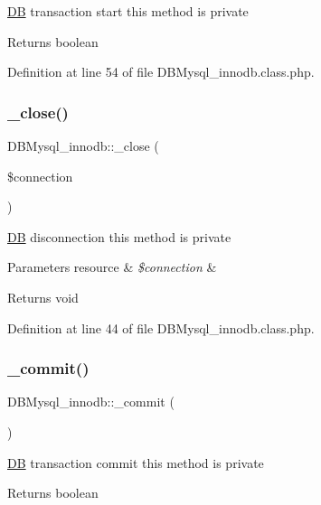 \hyperlink{classDB}{DB} transaction start this method is private \begin{DoxyReturn}{Returns}
boolean 
\end{DoxyReturn}


Definition at line 54 of file D\+B\+Mysql\+\_\+innodb.\+class.\+php.

\mbox{\label{classDBMysql__innodb_a006f982aef8b7fd2909d3912e0afb032}} 
\subsubsection{\texorpdfstring{\+\_\+close()}{\_close()}}
{\footnotesize\ttfamily D\+B\+Mysql\+\_\+innodb\+::\+\_\+close (\begin{DoxyParamCaption}\item[{}]{\$connection }\end{DoxyParamCaption})}

\hyperlink{classDB}{DB} disconnection this method is private 
\begin{DoxyParams}[1]{Parameters}
resource & {\em \$connection} & \\
\hline
\end{DoxyParams}
\begin{DoxyReturn}{Returns}
void 
\end{DoxyReturn}


Definition at line 44 of file D\+B\+Mysql\+\_\+innodb.\+class.\+php.

\mbox{\label{classDBMysql__innodb_a9ffbd5a0d262ae7dd7fb840822a7e543}} 
\subsubsection{\texorpdfstring{\+\_\+commit()}{\_commit()}}
{\footnotesize\ttfamily D\+B\+Mysql\+\_\+innodb\+::\+\_\+commit (\begin{DoxyParamCaption}{ }\end{DoxyParamCaption})}

\hyperlink{classDB}{DB} transaction commit this method is private \begin{DoxyReturn}{Returns}
boolean 
\end{DoxyReturn}


